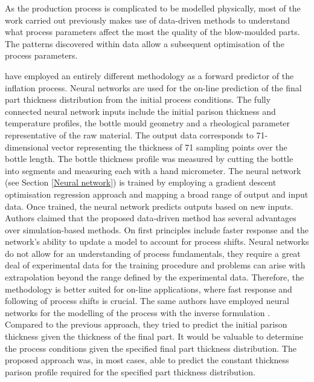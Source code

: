 As the production process is complicated to be modelled physically, most of the work carried out previously makes use of data-driven methods to understand what process parameters affect the most the quality of the blow-moulded parts. The patterns discovered within data allow a subsequent optimisation of the process parameters.

\citet{diraddo1993line} have employed an entirely different methodology as a forward predictor of the inflation process. Neural networks are used for the on-line prediction of the final part thickness distribution from the initial process conditions. The fully connected neural network inputs include the initial parison thickness and temperature profiles, the bottle mould geometry and a rheological parameter representative of the raw material. The output data corresponds to 71-dimensional vector representing the thickness of 71 sampling points over the bottle length. The bottle thickness profile was measured by cutting the bottle into segments and measuring each with a hand micrometer. The neural network (see Section \ref{Neural network}) is trained by employing a gradient descent optimisation regression approach and mapping a broad range of output and input data. Once trained, the neural network predicts outputs based on new inputs. Authors claimed that the proposed data-driven method has several advantages over simulation-based methods. On first principles include faster response and the network’s ability to update a model to account for process shifts. Neural networks do not allow for an understanding of process fundamentals, they require a great deal of experimental data for the training procedure and problems can arise with extrapolation beyond the range defined by the experimental data. Therefore, the methodology is better suited for on-line applications, where fast response and following of process shifts is crucial. The same authors have employed neural networks for the modelling of the process with the inverse formulation \citep{diraddo1993modeling}. Compared to the previous approach, they tried to predict the initial parison thickness given the thickness of the final part. It would be valuable to determine the process conditions given the specified final part thickness distribution. The proposed approach was, in most cases, able to predict the constant thickness parison profile required for the specified part thickness distribution.   

